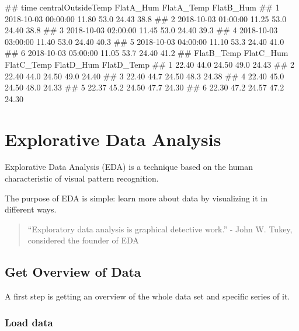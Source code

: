 \documentclass[
  a4paperpaper,
]{book}
\let\oldverbatim\verbatim
\let\endoldverbatim\endverbatim
\renewenvironment{verbatim}{\footnotesize\oldverbatim}{\endoldverbatim}
\begin{document}
\begin{verbatim}
##                  time centralOutsideTemp FlatA_Hum FlatA_Temp FlatB_Hum
## 1 2018-10-03 00:00:00              11.80      53.0      24.43      38.8
## 2 2018-10-03 01:00:00              11.25      53.0      24.40      38.8
## 3 2018-10-03 02:00:00              11.45      53.0      24.40      39.3
## 4 2018-10-03 03:00:00              11.40      53.0      24.40      40.3
## 5 2018-10-03 04:00:00              11.10      53.3      24.40      41.0
## 6 2018-10-03 05:00:00              11.05      53.7      24.40      41.2
##   FlatB_Temp FlatC_Hum FlatC_Temp FlatD_Hum FlatD_Temp
## 1      22.40      44.0      24.50      49.0      24.43
## 2      22.40      44.0      24.50      49.0      24.40
## 3      22.40      44.7      24.50      48.3      24.38
## 4      22.40      45.0      24.50      48.0      24.33
## 5      22.37      45.2      24.50      47.7      24.30
## 6      22.30      47.2      24.57      47.2      24.30
\end{verbatim}

\hypertarget{explorative-data-analysis}{%
\chapter{Explorative Data Analysis}\label{explorative-data-analysis}}

Explorative Data Analysis (EDA) is a technique based on the human characteristic of visual pattern recognition.

The purpose of EDA is simple: learn more about data by visualizing it in different ways.

\begin{quote}
``Exploratory data analysis is graphical detective work.'' - John W. Tukey, considered the founder of EDA
\end{quote}

\hypertarget{get-overview-of-data}{%
\section{Get Overview of Data}\label{get-overview-of-data}}

A first step is getting an overview of the whole data set and specific series of it.

\hypertarget{load-data}{%
\subsection{Load data}\label{load-data}}
\end{document}
